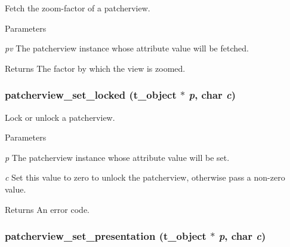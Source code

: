 Fetch the zoom-\/factor of a patcherview. 
\begin{DoxyParams}{Parameters}
\item[{\em pv}]The patcherview instance whose attribute value will be fetched. \end{DoxyParams}
\begin{DoxyReturn}{Returns}
The factor by which the view is zoomed. 
\end{DoxyReturn}
\hypertarget{group__jpatcherview_ga826eb120924785345d8a7851d31ce788}{
\subsubsection[{patcherview\_\-set\_\-locked}]{ patcherview\_\-set\_\-locked ({\bf t\_\-object} $\ast$ {\em p}, \/  char {\em c})}}
\label{group__jpatcherview_ga826eb120924785345d8a7851d31ce788}


Lock or unlock a patcherview. 
\begin{DoxyParams}{Parameters}
\item[{\em p}]The patcherview instance whose attribute value will be set. \item[{\em c}]Set this value to zero to unlock the patcherview, otherwise pass a non-\/zero value. \end{DoxyParams}
\begin{DoxyReturn}{Returns}
An error code. 
\end{DoxyReturn}
\hypertarget{group__jpatcherview_ga349cf62e72891016e0dcf8ab51c00a62}{
\subsubsection[{patcherview\_\-set\_\-presentation}]{ patcherview\_\-set\_\-presentation ({\bf t\_\-object} $\ast$ {\em p}, \/  char {\em c})}}
\label{group__jpatcherview_ga349cf62e72891016e0dcf8ab51c00a62}


